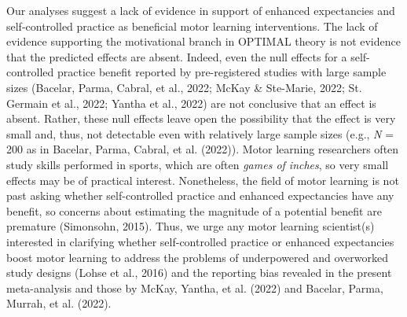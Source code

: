 \documentclass[
  man, donotrepeattitle,mask,floatsintext]{apa7}
\begin{document}
Our analyses suggest a lack of evidence in support of enhanced expectancies and self-controlled practice as beneficial motor learning interventions. The lack of evidence supporting the motivational branch in OPTIMAL theory is not evidence that the predicted effects are absent. Indeed, even the null effects for a self-controlled practice benefit reported by pre-registered studies with large sample sizes (Bacelar, Parma, Cabral, et al., 2022; McKay \& Ste-Marie, 2022; St. Germain et al., 2022; Yantha et al., 2022) are not conclusive that an effect is absent. Rather, these null effects leave open the possibility that the effect is very small and, thus, not detectable even with relatively large sample sizes (e.g., \emph{N} = 200 as in Bacelar, Parma, Cabral, et al. (2022)). Motor learning researchers often study skills performed in sports, which are often \emph{games of inches}, so very small effects may be of practical interest. Nonetheless, the field of motor learning is not past asking whether self-controlled practice and enhanced expectancies have any benefit, so concerns about estimating the magnitude of a potential benefit are premature (Simonsohn, 2015). Thus, we urge any motor learning scientist(s) interested in clarifying whether self-controlled practice or enhanced expectancies boost motor learning to address the problems of underpowered and overworked study designs (Lohse et al., 2016) and the reporting bias revealed in the present meta-analysis and those by McKay, Yantha, et al. (2022) and Bacelar, Parma, Murrah, et al. (2022).
\end{document}
